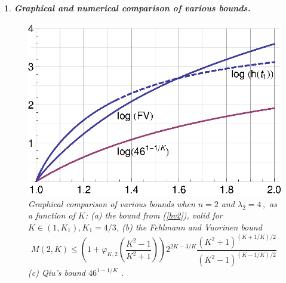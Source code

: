 \documentclass[12pt,a4paper,leqno]{amsart}
\theoremstyle{plain}
\newtheorem{subsec}[equation]{}
\numberwithin{equation}{section}          %
\begin{document}
\begin{subsec}{\bf Graphical and numerical comparison of various bounds.}
\begin{figure}
\includegraphics[width=12cm]{hqnew.eps}
\caption{Graphical comparison of various bounds
 when $n=2$ and $\lambda_2=4\,,$ as a function of $K$:
(a) the bound from (\ref{bv2}), valid for $K\in(1,K_1), K_1=4/3$,
  (b) the Fehlmann and Vuorinen bound \cite{fv}
$$M(2,K) \le \left(1+\varphi_{K,2}\left(\frac{K^2-1}{K^2+1}\right)\right)2^{2K-3/K}
\frac{(K^2+1)^{(K+1/K)/2}}{(K^2-1)^{(K-1/K)/2}}\,$$
(c) Qiu's bound $46^{1-1/K}$ \cite{q}.}
\end{figure}

\end{subsec}
\end{document}
